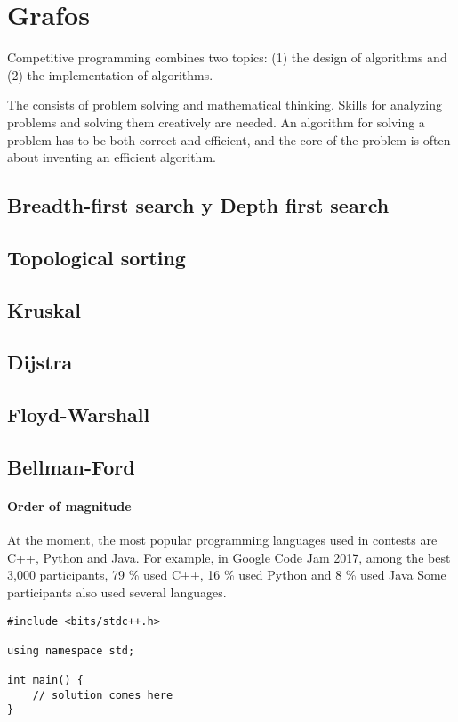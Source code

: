 \chapter{Grafos}

Competitive programming combines two topics:
(1) the design of algorithms and (2) the implementation of algorithms.

The  consists of problem solving
and mathematical thinking.
Skills for analyzing problems and solving them
creatively are needed.
An algorithm for solving a problem
has to be both correct and efficient,
and the core of the problem is often
about inventing an efficient algorithm.

\section{Breadth-first search y Depth first search}
\section{Topological sorting}
\section{Kruskal}
\section{Dijstra}
\section{Floyd-Warshall}
\section{Bellman-Ford}

\subsubsection*{Order of magnitude}


At the moment, the most popular programming
languages used in contests are C++, Python and Java.
For example, in Google Code Jam 2017,
among the best 3,000 participants,
79 \% used C++,
16 \% used Python and
8 \% used Java
Some participants also used several languages.

\begin{lstlisting}
#include <bits/stdc++.h>

using namespace std;

int main() {
    // solution comes here
}
\end{lstlisting}
